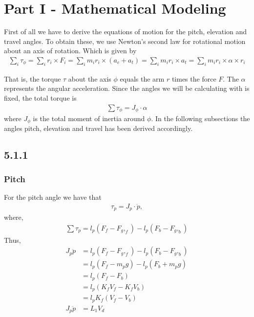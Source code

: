 \section*{Part I - Mathematical Modeling}

First of all we have to derive the equations of motion for the pitch, elevation and travel angles. To obtain these, we use Newton's second law for rotational motion about an axis of rotation. Which is given by
\begin{align*}
\sum_{i}\tau_\phi = \sum_{i}r_i\times F_i = \sum_{i}m_ir_i \times (a_c + a_t) = \sum_{i}m_ir_i \times a_t = \sum_{i}m_ir_i \times \alpha \times r_i
\end{align*} 

That is, the torque $\tau$ about the axis $\phi$ equals the arm $r$ times the force $F$. The $\alpha$ represents the angular acceleration. Since the angles we will be calculating with is fixed, the total torque is  
\begin{align*}
\sum\tau_\phi = J_\phi \cdot \alpha
\end{align*}
where $J_\phi$ is the total moment of inertia around $\phi$. In the following subsections the angles pitch, elevation and travel has been derived accordingly. 
\subsection*{5.1.1}
\subsubsection*{Pitch}
For the pitch angle we have that 
\begin{align*}
\tau_p = J_p\cdot \ddot{p},
\end{align*}
where,
\begin{align*}
\sum \tau_p = l_p(F_f-F_g,_f) - l_p(F_b-F_g,_b)
\end{align*}
Thus,
\begin{align*}
J_p \ddot{p} &= l_p(F_f-F_g,_f) - l_p(F_b-F_g,_b)\\
             &= l_p(F_f-m_pg) - l_p(F_b+ m_pg)\\
             &= l_p(F_f - F_b)\\
             &= l_p(K_fV_f - K_fV_b)\\
             &= l_pK_f(V_f - V_b)\\
J_p\ddot{p}  &= L_1V_d \tag{$2a$}\label{2a}
\end{align*}


